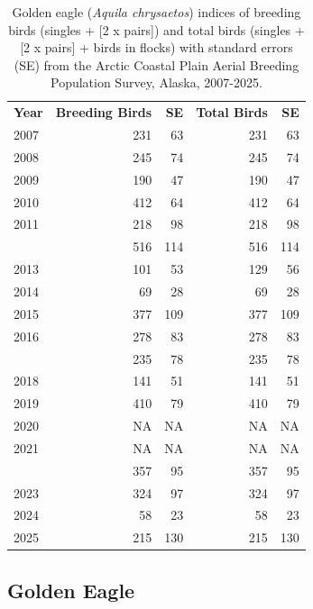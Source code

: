 \documentclass[
]{article}
\begin{document}
\begin{longtable}[t]{lrrrr}

\caption{\label{tbl-GOEA}Golden eagle (\emph{Aquila chrysaetos}) indices
of breeding birds (singles + {[}2 x pairs{]}) and total birds (singles +
{[}2 x pairs{]} + birds in flocks) with standard errors (SE) from the
Arctic Coastal Plain Aerial Breeding Population Survey, Alaska,
2007-2025.}

\tabularnewline

\\
\toprule
\textbf{Year} & \textbf{Breeding Birds} & \textbf{SE} & \textbf{Total Birds} & \textbf{SE}\\
\midrule
2007 & 231 & 63 & 231 & 63\\
2008 & 245 & 74 & 245 & 74\\
2009 & 190 & 47 & 190 & 47\\
2010 & 412 & 64 & 412 & 64\\
2011 & 218 & 98 & 218 & 98\\
\addlinespace
2012 & 516 & 114 & 516 & 114\\
2013 & 101 & 53 & 129 & 56\\
2014 & 69 & 28 & 69 & 28\\
2015 & 377 & 109 & 377 & 109\\
2016 & 278 & 83 & 278 & 83\\
\addlinespace
2017 & 235 & 78 & 235 & 78\\
2018 & 141 & 51 & 141 & 51\\
2019 & 410 & 79 & 410 & 79\\
2020 & NA & NA & NA & NA\\
2021 & NA & NA & NA & NA\\
\addlinespace
2022 & 357 & 95 & 357 & 95\\
2023 & 324 & 97 & 324 & 97\\
2024 & 58 & 23 & 58 & 23\\
2025 & 215 & 130 & 215 & 130\\
\bottomrule

\end{longtable}

\endgroup{}

\newpage{}

\subsection*{Golden Eagle}\label{golden-eagle-2}
\end{document}

